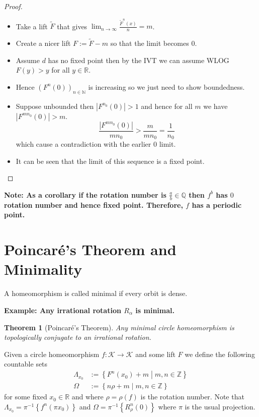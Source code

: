 \documentclass[11pt]{article}
\newcommand{\defeq}{:=}
\newcommand{\abs}[1]{|#1|}
\newcommand{\relmiddle}[1]{\mathrel{}\middle#1\mathrel{}}
\newcommand{\rmv}{\relmiddle|}
\newcommand{\R}{\mathbb{R}}
\newcommand{\Z}{\mathbb{Z}}
\newcommand{\N}{\mathbb{N}}
\newcommand{\Q}{\mathbb{Q}}
\newenvironment{defin}
	{\begin{mdframed}[backgroundcolor=white, roundcorner=5pt, linewidth=1pt, linecolor=Green]
		\setlength{\parindent}{0pt}}
	{\end{mdframed}}
\newcommand{\mdf}[1]{{\color{Green} #1}}
\newenvironment{note}
	{\begin{mdframed}[backgroundcolor=white, linecolor=red, roundcorner=5pt, linewidth=1pt]\bfseries{Note:}\normalfont
	\setlength{\parindent}{0pt}}
	{\end{mdframed}}
\newenvironment{eg}
	{\begin{mdframed}[backgroundcolor=mylg,roundcorner=5pt,linewidth=0pt]\bfseries{Example:}\normalfont
	\setlength{\parindent}{0pt}}
	{\end{mdframed}}
\newtheorem{theorem}{Theorem}[section]
\begin{document}
\begin{proof}
\begin{itemize}
	\item Take a lift $\widetilde{F}$ that gives $\lim_{n\to\infty}\frac{\widetilde{F}^n(x)}{n}=m$.
	\item Create a nicer lift $F\defeq\widetilde{F}-m$ so that the limit becomes $0$.
	\item Assume $d$ has no fixed point then by the IVT we can assume WLOG $F(y) > y$ for all $y\in\R$.
	\item Hence $\left(F^n(0)\right)_{n\in\N}$ is increasing so we just need to show boundedness.
	\item Suppose unbounded then $\abs{F^{n_0}(0)}>1$ and hence for all $m$ we have $\abs{F^{mn_0}(0)} > m$.
		\[
			\frac{\abs{F^{mn_0}(0)}}{mn_0} > \frac{m}{mn_0} = \frac{1}{n_0}
		\]
		which cause a contradiction with the earlier $0$ limit.
	\item It can be seen that the limit of this sequence is a fixed point.
\end{itemize}
\end{proof}

\begin{note}
	As a corollary if the rotation number is $\frac{a}{b}\in\Q$ then $f^b$ has $0$ rotation number and hence fixed point.
	Therefore, $f$ has a periodic point.
\end{note}

\section{Poincar\'e's Theorem and Minimality}

\begin{defin}
	A homeomorphism is called \mdf{minimal} if every orbit is dense.	
\end{defin}

\begin{eg}
Any irrational rotation $R_\alpha$ is minimal.
\end{eg}

\begin{theorem}[Poincar\'e's Theorem]
Any minimal circle homeomorphism is topologically conjugate to an irrational rotation.
\end{theorem}

Given a circle homeomorphism $f:\mathcal{K}\to\mathcal{K}$ and some lift $F$ we define the following countable sets
\begin{align*}
	\Lambda_{x_0}&\defeq\left\{F^n(x_0)+m \rmv m, n\in \Z\right\}\\
	\Omega &\defeq \left\{n \rho +m \rmv m, n \in \Z\right\}
\end{align*}
for some fixed $x_0\in\R$ and where $\rho = \rho(f)$ is the rotation number.
Note that $\Lambda_{x_0}=\pi^{-1}\left\{f^n(\pi x_0)\right\}$ and $\Omega=\pi^{-1}\left\{R_\rho ^n (0)\right\}$ where $\pi$ is the usual projection.
\end{document}
